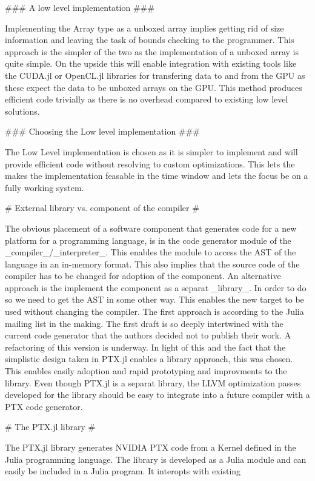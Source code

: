 \begin{markdown}
### A low level implementation ###
\label{sec:meth:arrays:low-level}

Implementing the Array type as a unboxed array implies getting rid of
size information and leaving the task of bounds checking to the
programmer. This approach is the simpler of the two as the
implementation of a unboxed array is quite simple. On the upside this
will enable integration with existing tools like the CUDA.jl or
OpenCL.jl libraries for transfering data to and from the GPU as these
expect the data to be unboxed arrays on the GPU. This method produces
efficient code trivially as there is no overhead compared to existing
low level solutions.

### Choosing the Low level implementation ###

The Low Level implementation is chosen as it is simpler to implement
and will provide efficient code without resolving to custom
optimizations. This lets the makes the implementation feasable in the
time window and lets the focus be on a fully working system. 

# External library vs. component of the compiler #
\label{sec:meth:lib-b-comp}

The obvious placement of a software component that generates code for
a new platform for a programming language, is in the code generator
module of the _compiler_/_interpreter_. This enables the module to
access the AST of the language in an in-memory format. This also
implies that the source code of the compiler has to be changed for
adoption of the component. An alternative approach is the implement
the component as a separat _library_. In order to do so we need to get
the AST in some other way. This enables the new target to be used
without changing the compiler. The first approach is according to the
Julia mailing list in the making. The first draft is so deeply
intertwined with the current code generator that the authors decided
not to publish their work. A refactoring of this version is
underway. In light of this and the fact that the simplistic design
taken in PTX.jl enables a library approach, this was chosen. This
enables easily adoption and rapid prototyping and improvments to the
library. Even though PTX.jl is a separat library, the LLVM
optimization passes developed for the library should be easy to
integrate into a future compiler with a PTX code generator.

# The PTX.jl library #
\label{sec:meth:ptx}
  
The PTX.jl library generates NVIDIA PTX code from a Kernel defined in
the Julia programming language. The library is developed as a Julia
module and can easily be included in a Julia program. It interopts
with existing 


\end{markdown}
